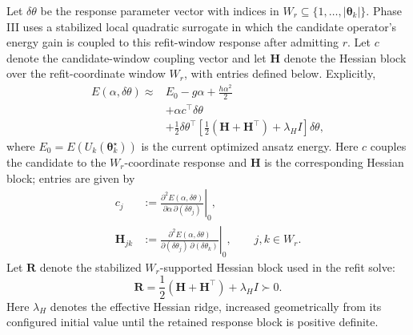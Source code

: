 \documentclass[
  reprint,
  amsmath,
  amssymb,
  aps,
  pra,
  nofootinbib,
  superscriptaddress,
  floatfix
]{revtex4-2}
\begin{document}
Let $\delta\theta$ be the response parameter vector with indices in \(W_r\subseteq\{1,\ldots,|\boldsymbol{\theta}_k|\}\). Phase III uses a stabilized local quadratic surrogate in which the candidate operator's energy gain is coupled to this refit-window response after admitting $r$.
Let \(c\) denote the candidate-window coupling vector and let \(\mathbf H\) denote the Hessian block over the refit-coordinate window \(W_r\), with entries defined below. Explicitly, 
\begin{equation}
\begin{split}
E(\alpha,\delta\theta)\approx{}&E_0-g\alpha+\frac{h\alpha^2}{2} \\
&+\alpha c^{\top}\delta\theta \\
&+\frac12\delta\theta^{\top}
\left[\frac12(\mathbf H+\mathbf H^{\top})+\lambda_HI\right]
\delta\theta,
\end{split}
\label{eq:local_quadratic}
\end{equation}
where \(E_0=E(U_k(\boldsymbol\theta_k^\star))\) is the current optimized ansatz energy. Here $c$ couples the candidate to the \(W_r\)-coordinate response and $\mathbf{H}$ is the corresponding Hessian block; entries are given by
\begin{equation}
\begin{aligned}
c_j&:=
\left.
\frac{\partial^2E(\alpha,\delta\theta)}
{\partial\alpha\,\partial(\delta\theta_j)}
\right|_0,\\
\mathbf{H}_{jk}&:=
\left.
\frac{\partial^2E(\alpha,\delta\theta)}
{\partial(\delta\theta_j)\,\partial(\delta\theta_k)}
\right|_0,
\qquad j,k\in W_r .
\end{aligned}
\label{eq:phase3_window_derivatives}
\end{equation}
Let \(\mathbf R\) denote the stabilized \(W_r\)-supported Hessian block used in the refit solve:
\begin{equation}
\mathbf R=\frac12(\mathbf H+\mathbf H^{\top})+\lambda_HI\succ0.
\label{eq:phase3_regularized_hessian}
\end{equation}
Here \(\lambda_H\) denotes the effective Hessian ridge, increased geometrically
from its configured initial value until the retained response block is positive
definite.
\end{document}
